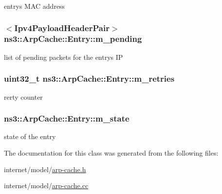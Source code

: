 entry\textquotesingle{}s M\+AC address 

\subsubsection[{\texorpdfstring{m\+\_\+pending}{m_pending}}]{$<${\bf Ipv4\+Payload\+Header\+Pair}$>$ ns3\+::\+Arp\+Cache\+::\+Entry\+::m\+\_\+pending\hspace{0.3cm}{\ttfamily [private]}}\hypertarget{classns3_1_1ArpCache_1_1Entry_a0f483e62340da794a052c71498fb0318}{}\label{classns3_1_1ArpCache_1_1Entry_a0f483e62340da794a052c71498fb0318}


list of pending packets for the entry\textquotesingle{}s IP 

\subsubsection[{\texorpdfstring{m\+\_\+retries}{m_retries}}]{\setlength{\rightskip}{0pt plus 5cm}uint32\+\_\+t ns3\+::\+Arp\+Cache\+::\+Entry\+::m\+\_\+retries\hspace{0.3cm}{\ttfamily [private]}}\hypertarget{classns3_1_1ArpCache_1_1Entry_aa19aecb5fe13b4ec2814c80e8c0c6f11}{}\label{classns3_1_1ArpCache_1_1Entry_aa19aecb5fe13b4ec2814c80e8c0c6f11}


rerty counter 

\subsubsection[{\texorpdfstring{m\+\_\+state}{m_state}}]{ ns3\+::\+Arp\+Cache\+::\+Entry\+::m\+\_\+state\hspace{0.3cm}{\ttfamily [private]}}\hypertarget{classns3_1_1ArpCache_1_1Entry_adb18d4ee6f4b15415822c18296a68497}{}\label{classns3_1_1ArpCache_1_1Entry_adb18d4ee6f4b15415822c18296a68497}


state of the entry 



The documentation for this class was generated from the following files\+:\begin{DoxyCompactItemize}
\item 
internet/model/\hyperlink{arp-cache_8h}{arp-\/cache.\+h}\item 
internet/model/\hyperlink{arp-cache_8cc}{arp-\/cache.\+cc}\end{DoxyCompactItemize}
